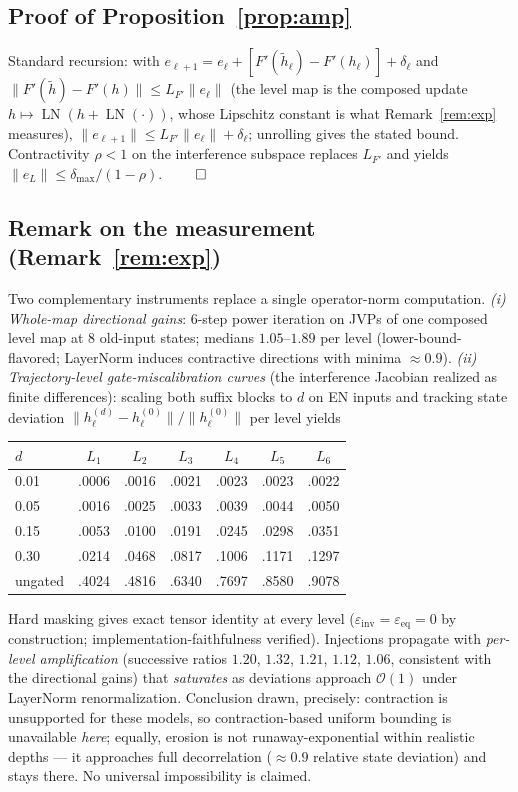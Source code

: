 \documentclass[11pt]{article}
\theoremstyle{definition}\newtheorem{definition}{Definition}
\theoremstyle{remark}\newtheorem{remark}{Remark}
\begin{document}
\subsection{Proof of Proposition~\ref{prop:amp}}
Standard recursion: with $e_{\ell+1}=e_\ell+[F'(\tilde h_\ell)-F'(h_\ell)]+\delta_\ell$ and
$\|F'(\tilde h)-F'(h)\|\le L_{F'}\|e_\ell\|$ (the level map is the composed update
$h\mapsto\operatorname{LN}(h+\operatorname{LN}(\cdot))$, whose Lipschitz constant is what
Remark~\ref{rem:exp} measures),
$\|e_{\ell+1}\|\le L_{F'}\|e_\ell\|+\delta_\ell$; unrolling gives the stated bound.
Contractivity $\rho<1$ on the interference subspace replaces $L_{F'}$ and yields
$\|e_L\|\le\delta_{\max}/(1-\rho)$. \hfill$\qed$

\subsection{Remark on the measurement (Remark~\ref{rem:exp})}\label{app:meas}
Two complementary instruments replace a single operator-norm computation.
\emph{(i) Whole-map directional gains}: 6-step power iteration on JVPs of one composed
level map at 8 old-input states; medians $1.05$--$1.89$ per level (lower-bound-flavored;
LayerNorm induces contractive directions with minima ${\approx}0.9$).
\emph{(ii) Trajectory-level gate-miscalibration curves} (the interference Jacobian realized
as finite differences): scaling both suffix blocks to $d$ on EN inputs and tracking state
deviation $\|h^{(d)}_\ell-h^{(0)}_\ell\|/\|h^{(0)}_\ell\|$ per level yields

\begin{center}\small
\begin{tabular}{lcccccc}
\toprule
$d$ & $L_1$ & $L_2$ & $L_3$ & $L_4$ & $L_5$ & $L_6$ \\
\midrule
0.01 & .0006 & .0016 & .0021 & .0023 & .0023 & .0022 \\
0.05 & .0016 & .0025 & .0033 & .0039 & .0044 & .0050 \\
0.15 & .0053 & .0100 & .0191 & .0245 & .0298 & .0351 \\
0.30 & .0214 & .0468 & .0817 & .1006 & .1171 & .1297 \\
ungated & .4024 & .4816 & .6340 & .7697 & .8580 & .9078 \\
\bottomrule
\end{tabular}
\end{center}

Hard masking gives exact tensor identity at every level ($\varepsilon_{\mathrm{inv}}
=\varepsilon_{\mathrm{eq}}=0$ by construction; implementation-faithfulness verified).
Injections propagate with \emph{per-level amplification} (successive ratios $1.20$, $1.32$, $1.21$, $1.12$, $1.06$,
consistent with the directional gains) that \emph{saturates} as deviations approach
$\mathcal{O}(1)$ under LayerNorm renormalization. Conclusion drawn, precisely: contraction
is unsupported for these models, so contraction-based uniform bounding is unavailable
\emph{here}; equally, erosion is not runaway-exponential within realistic depths --- it
approaches full decorrelation (${\approx}0.9$ relative state deviation) and stays there.
No universal impossibility is claimed.
\end{document}

